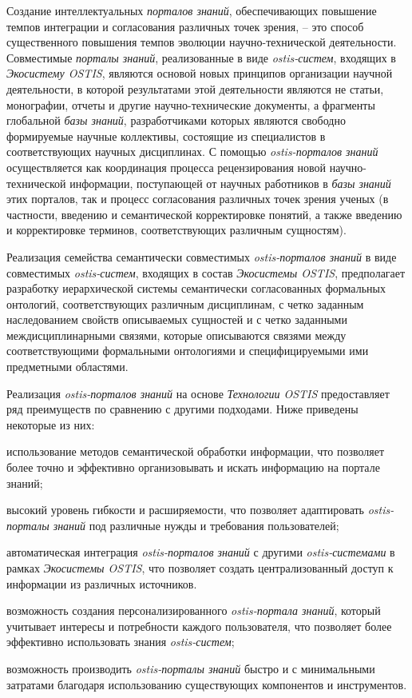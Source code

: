 Создание интеллектуальных \textit{порталов знаний}, обеспечивающих повышение темпов интеграции и согласования различных точек зрения, – это способ существенного повышения темпов эволюции научно-технической деятельности.
Совместимые \textit{порталы знаний}, реализованные в виде \textit{ostis-систем}, входящих в \textit{Экосистему OSTIS}, являются основой новых принципов организации научной деятельности, в которой результатами этой деятельности являются не статьи, монографии, отчеты и другие научно-технические документы, а фрагменты глобальной \textit{базы знаний}, разработчиками которых являются свободно формируемые научные коллективы, состоящие из специалистов в соответствующих научных дисциплинах. 
С помощью \textit{ostis-порталов знаний} осуществляется как координация процесса рецензирования новой научно-технической информации, поступающей от научных работников в \textit{базы знаний} этих порталов, так и процесс согласования различных точек зрения ученых (в частности, введению и семантической корректировке понятий, а также введению и корректировке терминов, соответствующих различным сущностям).

Реализация семейства семантически совместимых \textit{ostis-порталов знаний} в виде совместимых \textit{ostis-систем}, входящих в состав \textit{Экосистемы OSTIS}, предполагает разработку иерархической системы семантически согласованных формальных онтологий, соответствующих различным дисциплинам, с четко заданным наследованием свойств описываемых сущностей и с четко заданными междисциплинарными связями, которые описываются связями между соответствующими формальными онтологиями и специфицируемыми ими предметными областями.

Реализация \textit{ostis-порталов знаний} на основе \textit{Технологии OSTIS} предоставляет ряд преимуществ по сравнению с другими подходами. Ниже приведены некоторые из них:
\begin{textitemize}
    \item использование методов семантической обработки информации, что позволяет более точно и эффективно организовывать и искать информацию на портале знаний;
    \item высокий уровень гибкости и расширяемости, что позволяет адаптировать \textit{ostis-порталы знаний} под различные нужды и требования пользователей;
    \item автоматическая интеграция \textit{ostis-порталов знаний} с другими \textit{ostis-системами} в рамках \textit{Экосистемы OSTIS}, что позволяет создать централизованный доступ к информации из различных источников.
    \item возможность создания персонализированного \textit{ostis-портала знаний}, который учитывает интересы и потребности каждого пользователя, что позволяет более эффективно использовать знания \textit{ostis-систем};
    \item возможность производить \textit{ostis-порталы знаний} быстро и с минимальными затратами благодаря использованию существующих компонентов и инструментов.
\end{textitemize}

